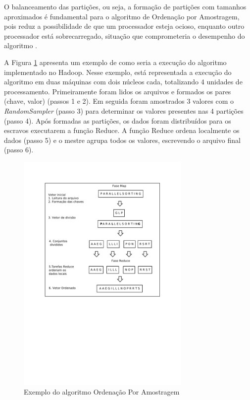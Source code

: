O balanceamento das partições, ou seja, a formação de partições com tamanhos aproximados é fundamental para o algoritmo de Ordenação por Amostragem, pois reduz a possibilidade de que um processador esteja ocioso, enquanto outro processador está sobrecarregado, situação que comprometeria o desempenho do algoritmo \cite{White:2009}.


A Figura \ref{fig:samplesort} apresenta um exemplo de como seria a execução do algoritmo implementado no Hadoop. 
Nesse exemplo, está representada a execução do algoritmo em duas máquinas com dois núcleos cada, totalizando 4 unidades de processamento. 
Primeiramente foram lidos os arquivos e formados os pares (chave, valor) (passos 1 e 2). 
 Em seguida foram amostrados 3 valores com o \textit{RandomSampler}  (passo 3) para determinar os valores presentes nas 4 partições  (passo 4). Após formadas as partições, os dados foram distribuídos para os escravos executarem a função Reduce.  
A função Reduce ordena localmente os dados  (passo 5) e o mestre agrupa todos os valores, escrevendo o arquivo final (passo 6).

\begin{figure}[htb]
\centering
\includegraphics[trim=2cm 11cm 2cm 2cm, width=0.75\textwidth]{figuras/SampleSort.pdf}
\caption{Exemplo do algoritmo Ordenação Por Amostragem}
\label{fig:samplesort}
\end{figure}

